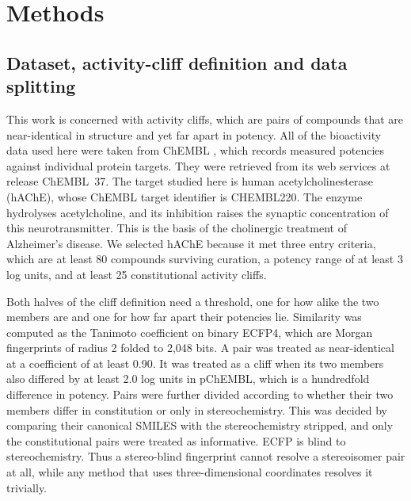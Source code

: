 \section{Methods}

\subsection{Dataset, activity-cliff definition and data splitting}\label{sec:dataset}

This work is concerned with activity cliffs, which are pairs of compounds that are
near-identical in structure and yet far apart in potency. All of the bioactivity data
used here were taken from ChEMBL \citep{chembl}, which records measured potencies
against individual protein targets. They were retrieved from its web services at
release ChEMBL~37. The target studied here is human acetylcholinesterase (hAChE), whose
ChEMBL target identifier is CHEMBL220. The enzyme hydrolyses acetylcholine, and its
inhibition raises the synaptic concentration of this neurotransmitter. This is the
basis of the cholinergic treatment of Alzheimer's disease. We selected hAChE because it
met three entry criteria, which are at least 80 compounds surviving curation, a potency
range of at least 3 log units, and at least 25 constitutional activity cliffs.

Both halves of the cliff definition need a threshold, one for how alike the two members
are and one for how far apart their potencies lie. Similarity was computed as the
Tanimoto coefficient on binary ECFP4, which are Morgan fingerprints of radius 2 folded
to 2{,}048 bits. A pair was treated as near-identical at a coefficient of at least
0.90. It was treated as a cliff when its two members also differed by at least 2.0 log
units in pChEMBL, which is a hundredfold difference in potency. Pairs were further
divided according to whether their two members differ in constitution or only in
stereochemistry. This was decided by comparing their canonical SMILES with the
stereochemistry stripped, and only the constitutional pairs were treated as
informative. ECFP is blind to stereochemistry. Thus a stereo-blind fingerprint cannot
resolve a stereoisomer pair at all, while any method that uses three-dimensional
coordinates resolves it trivially.

